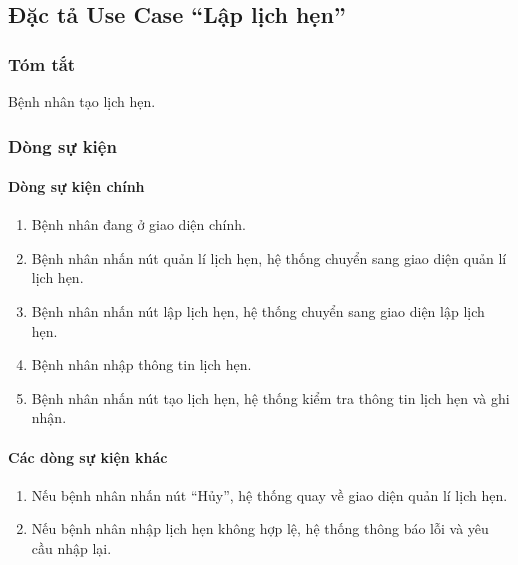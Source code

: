 \subsection{Đặc tả Use Case ``Lập lịch hẹn''}

\subsubsection{Tóm tắt}
Bệnh nhân tạo lịch hẹn.

\subsubsection{Dòng sự kiện}
\paragraph{\textbf{Dòng sự kiện chính}}
\begin{enumerate}
  \item Bệnh nhân đang ở giao diện chính.
  \item Bệnh nhân nhấn nút quản lí lịch hẹn, hệ thống chuyển sang giao diện quản lí lịch hẹn.
  \item Bệnh nhân nhấn nút lập lịch hẹn, hệ thống chuyển sang giao diện lập lịch hẹn.
  \item Bệnh nhân nhập thông tin lịch hẹn.
  \item Bệnh nhân nhấn nút tạo lịch hẹn, hệ thống kiểm tra thông tin lịch hẹn và ghi nhận.
\end{enumerate}

\paragraph{\textbf{Các dòng sự kiện khác}}
\begin{enumerate}
  \item Nếu bệnh nhân nhấn nút ``Hủy'', hệ thống quay về giao diện quản lí lịch hẹn.
  \item Nếu bệnh nhân nhập lịch hẹn không hợp lệ, hệ thống thông báo lỗi và yêu cầu nhập lại.
\end{enumerate}

